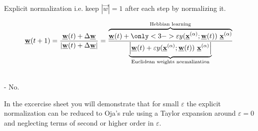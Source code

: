 \begin{frame}{\subsecname}

\begin{block}{Explicit normalization} 
i.e. keep $|\vec w| = 1$ after each step by normalizing it.

\begin{equation}
	\vec{w}(t+1) = 
    \frac{\vec w(t) + \Delta \vec w}{|\vec w(t) + \Delta \vec w|} 
    = \frac
    {\overbrace{\vec{w}(t) + {\only<3->{\color{blue}}\varepsilon y(\vec{x}^{(\alpha)}; \vec{w}(t))~\vec{x}^{(\alpha)}}}^{\text{Hebbian learning}}}
    {\underbrace{\left| \vec{w}(t) + \varepsilon y(\vec{x}^{(\alpha)}; \vec{w}(t))~\vec{x}^{(\alpha)} \right|}_{\text{Euclidean weights normalization}}}
    \label{eq:explicitnorm}
\end{equation}




\end{block}


\end{frame}

\begin{frame}

\\

- No.\\

\pause

In the excercise sheet you will demonstrate that for small $\varepsilon$ the explicit normalization can be reduced to Oja's rule using a Taylor expansion around $\varepsilon = 0$ and neglecting terms of second or higher order in $\varepsilon$. 

\end{frame}
